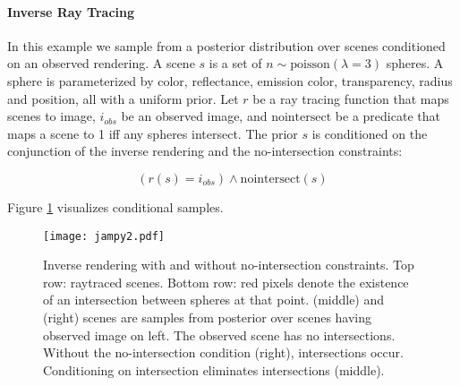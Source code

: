 \paragraph{Inverse Ray Tracing}
In this example we sample from a posterior distribution over scenes conditioned on an observed rendering.  A scene $s$ is a set of $n \sim \textrm{poisson}(\lambda = 3)$ spheres.
A sphere is parameterized by color, reflectance, emission color, transparency, radius and position, all with a uniform prior.
Let $r$ be a ray tracing function that maps scenes to image, $i_{obs}$ be an observed image, and $\textrm{nointersect}$ be a predicate that maps a scene to 1 iff any spheres intersect.
The prior $s$ is conditioned on the conjunction of the inverse rendering and the no-intersection constraints:

\begin{equation}
(r(s) = i_{obs}) \land \textrm{nointersect}(s)
\end{equation}

Figure \ref{fig:invrtmcmc} visualizes conditional samples.

\begin{figure}
	\centering
	\texttt{[image: jampy2.pdf]}
	\caption{Inverse rendering with and without no-intersection constraints.  Top row: raytraced scenes.  Bottom row: red pixels denote the existence of an intersection between spheres at that point.  (middle) and (right) scenes are samples from posterior over scenes having observed image on left.  The observed scene has no intersections.  Without the no-intersection condition (right), intersections occur.  Conditioning on intersection eliminates intersections (middle).}
	\label{fig:invrtmcmc}
	\vspace{-1em}
\end{figure}


